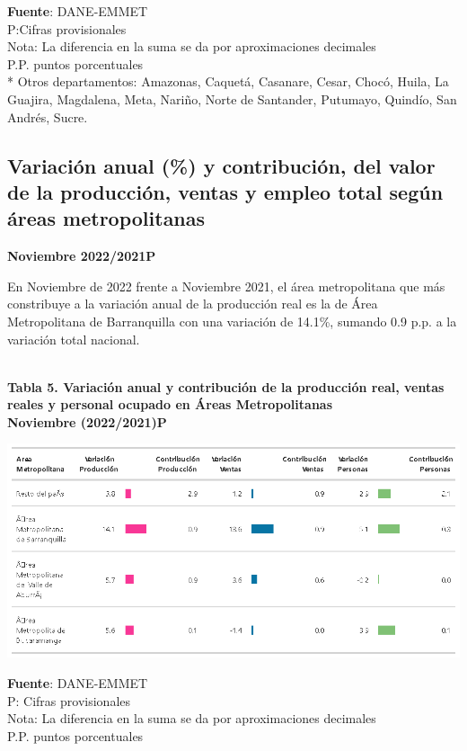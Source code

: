 \documentclass[
]{article}
\begin{document}
\textbf{Fuente}: DANE-EMMET\\
P:Cifras provisionales\\
Nota: La diferencia en la suma se da por aproximaciones decimales\\
P.P. puntos porcentuales\\
* Otros departamentos: Amazonas, Caquetá, Casanare, Cesar, Chocó, Huila,
La Guajira, Magdalena, Meta, Nariño, Norte de Santander, Putumayo,
Quindío, San Andrés, Sucre.

\hypertarget{variaciuxf3n-anual-y-contribuciuxf3n-del-valor-de-la-producciuxf3n-ventas-y-empleo-total-seguxfan-uxe1reas-metropolitanas}{%
\subsection{Variación anual (\%) y contribución, del valor de la
producción, ventas y empleo total según áreas
metropolitanas}\label{variaciuxf3n-anual-y-contribuciuxf3n-del-valor-de-la-producciuxf3n-ventas-y-empleo-total-seguxfan-uxe1reas-metropolitanas}}

\textbf{Noviembre 2022/2021P}

En Noviembre de 2022 frente a Noviembre 2021, el área metropolitana que
más constribuye a la variación anual de la producción real es la de Área
Metropolitana de Barranquilla con una variación de 14.1\%, sumando 0.9
p.p. a la variación total nacional.\\
\strut \\
\textbf{Tabla 5. Variación anual y contribución de la producción real,
ventas reales y personal ocupado en Áreas Metropolitanas}\\
\textbf{Noviembre (2022/2021)P}

\begin{center}\includegraphics[width=13.14in]{tabla5_1} \end{center}

\textbf{Fuente}: DANE-EMMET\\
P: Cifras provisionales\\
Nota: La diferencia en la suma se da por aproximaciones decimales\\
P.P. puntos porcentuales
\end{document}
